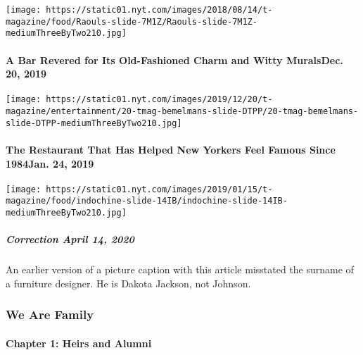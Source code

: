 \texttt{[image: https://static01.nyt.com/images/2018/08/14/t-magazine/food/Raouls-slide-7M1Z/Raouls-slide-7M1Z-mediumThreeByTwo210.jpg]}
\href{https://www.nytimes.com/2019/12/20/t-magazine/bemelmans-bar.html}{}

\hypertarget{a-bar-revered-for-its-old-fashioned-charm-and-witty-muralsdec-20-2019}{%
\paragraph{A Bar Revered for Its Old-Fashioned Charm and Witty
MuralsDec. 20,
2019}\label{a-bar-revered-for-its-old-fashioned-charm-and-witty-muralsdec-20-2019}}

\texttt{[image: https://static01.nyt.com/images/2019/12/20/t-magazine/entertainment/20-tmag-bemelmans-slide-DTPP/20-tmag-bemelmans-slide-DTPP-mediumThreeByTwo210.jpg]}
\href{https://www.nytimes.com/2019/01/24/t-magazine/indochine-restaurant-history.html}{}

\hypertarget{the-restaurant-that-has-helped-new-yorkers-feel-famous-since-1984jan-24-2019}{%
\paragraph{The Restaurant That Has Helped New Yorkers Feel Famous Since
1984Jan. 24,
2019}\label{the-restaurant-that-has-helped-new-yorkers-feel-famous-since-1984jan-24-2019}}

\texttt{[image: https://static01.nyt.com/images/2019/01/15/t-magazine/food/indochine-slide-14IB/indochine-slide-14IB-mediumThreeByTwo210.jpg]}

\hypertarget{correction-april-14-2020}{%
\subparagraph{\texorpdfstring{\textbf{Correction} April 14,
2020}{Correction April 14, 2020}}\label{correction-april-14-2020}}

An earlier version of a picture caption with this article misstated the
surname of a furniture designer. He is Dakota Jackson, not Johnson.

\hypertarget{we-are-family-1}{%
\subsubsection{We Are Family}\label{we-are-family-1}}

\hypertarget{chapter-1-heirs-and-alumni}{%
\paragraph{Chapter 1: Heirs and
Alumni}\label{chapter-1-heirs-and-alumni}}

